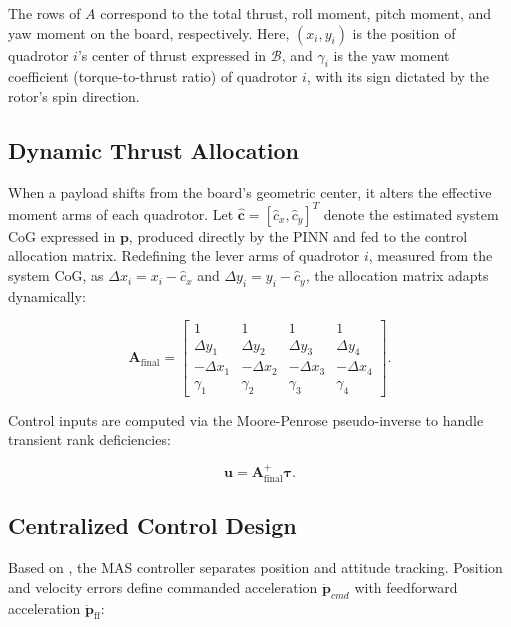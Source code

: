 The rows of $A$ correspond to the total thrust, roll moment, pitch moment, and yaw moment on the board, respectively. Here, $(x_i, y_i)$ is the position of quadrotor $i$'s center of thrust expressed in $\mathcal{B}$, and $\gamma_i$ is the yaw moment coefficient (torque-to-thrust ratio) of quadrotor $i$, with its sign dictated by the rotor's spin direction.

\subsection{Dynamic Thrust Allocation}

When a payload shifts from the board's geometric center, it alters the
effective moment arms of each quadrotor. Let $\hat{\mathbf{c}} =
[\hat{c}_x, \hat{c}_y]^T$ denote the estimated system CoG expressed in
$\mathbf{p}$, produced directly by the PINN and fed to the control
allocation matrix. Redefining the lever arms of quadrotor $i$, measured from
the system CoG, as $\Delta x_i = x_i - \hat{c}_x$ and $\Delta y_i = y_i -
\hat{c}_y$, the allocation matrix adapts dynamically:

\begin{equation}
    \mathbf{A}_{\text{final}} =
    \begin{bmatrix}
        1 & 1 & 1 & 1 \\
        \Delta y_1 & \Delta y_2 & \Delta y_3 & \Delta y_4 \\
        -\Delta x_1 & -\Delta x_2 & -\Delta x_3 & -\Delta x_4 \\
        \gamma_1 & \gamma_2 & \gamma_3 & \gamma_4
    \end{bmatrix}.
    \label{eq:allocation_matrix}
\end{equation}

\noindent Control inputs are computed via the Moore-Penrose pseudo-inverse to
handle transient rank deficiencies:

\begin{equation}
    \mathbf{u} = \mathbf{A}_{\text{final}}^{+}\boldsymbol{\tau}.
    \label{eq:final_u}
\end{equation}

\subsection{Centralized Control Design}
Based on \cite{mellinger2013trajectory}, the MAS controller separates position and attitude tracking. Position and velocity errors define commanded acceleration $\mathbf{\ddot{p}}_{cmd}$ with feedforward acceleration $\mathbf{\ddot{p}}_{\text{ff}}$:

